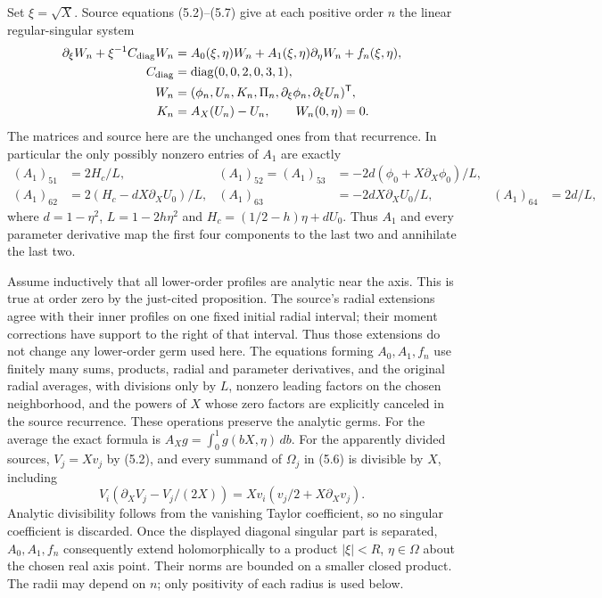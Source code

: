 Set $\xi=\sqrt X$. Source equations (5.2)--(5.7) give at each
positive order $n$ the linear regular-singular system
\begin{equation}
\begin{split}
 \partial_\xi W_n+\xi^{-1}C_{\rm diag}W_n
       &=A_0(\xi,\eta)W_n+
             A_1(\xi,\eta)\partial_\eta W_n+f_n(\xi,\eta),\\
 C_{\rm diag}&=\operatorname{diag}(0,0,2,0,3,1),\\
 W_n&=(\phi_n,U_n,K_n,\Pi_n,\partial_\xi\phi_n,
                                      \partial_\xi U_n)^{\mathsf T},\\
 K_n&=A_X(U_n)-U_n,\qquad W_n(0,\eta)=0 .
\end{split}
 \label{eq:cq-actual-axis-linear-system}
\end{equation}
The matrices and source here are the unchanged ones from that
recurrence. In particular the only possibly nonzero entries of
$A_1$ are exactly
\begin{align*}
 (A_1)_{51}&=2H_c/L,&
 (A_1)_{52}=(A_1)_{53}
     &=-2d(\phi_0+X\partial_X\phi_0)/L,\\
 (A_1)_{62}&=2(H_c-dX\partial_XU_0)/L,&
 (A_1)_{63}&=-2dX\partial_XU_0/L,&
 (A_1)_{64}&=2d/L,
\end{align*}
where $d=1-\eta^2$, $L=1-2h\eta^2$ and
$H_c=(1/2-h)\eta+dU_0$. Thus $A_1$ and every parameter derivative
map the first four components to the last two and annihilate
the last two.

Assume inductively that all lower-order profiles are analytic near
the axis. This is true at order zero by the just-cited proposition.
The source's radial extensions agree with their inner profiles on
one fixed initial radial interval; their moment corrections have
support to the right of that interval. Thus those extensions do not
change any lower-order germ used here. The equations forming
$A_0,A_1,f_n$ use finitely many sums, products, radial and parameter
derivatives, and the original radial averages, with divisions only
by $L$, nonzero leading factors on the chosen neighborhood, and
the powers of $X$ whose zero factors are explicitly canceled in
the source recurrence. These operations preserve the analytic
germs. For the average the exact formula is
$A_Xg=\int_0^1g(bX,\eta)\,db$. For the apparently divided sources,
$V_j=Xv_j$ by (5.2), and every summand of $\Omega_j$ in (5.6)
is divisible by $X$, including
\[
 V_i(\partial_XV_j-V_j/(2X))
       =Xv_i(v_j/2+X\partial_Xv_j).
\]
Analytic divisibility follows from the vanishing Taylor coefficient,
so no singular coefficient is discarded. Once the displayed
diagonal singular part is separated, $A_0,A_1,f_n$ consequently
extend holomorphically to a product
$|\xi|<R$, $\eta\in\Omega$ about the chosen real axis point.
Their norms are bounded on a smaller closed product. The radii
may depend on $n$; only positivity of each radius is used below.

